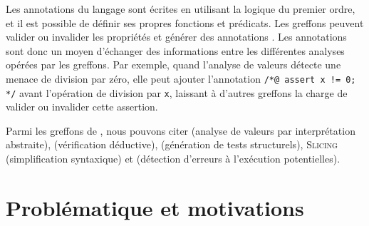 Les annotations du langage \acsl sont écrites en utilisant la logique
du premier ordre, et il est possible de définir ses propres fonctions et
prédicats.
Les greffons peuvent valider ou invalider les propriétés \acsl et
générer des annotations \acsl.
Les annotations sont donc un moyen d'échanger des informations entre les
différentes analyses opérées par les greffons.
Par exemple, quand l'analyse de valeurs détecte une menace de division par zéro,
elle peut ajouter l'annotation \lstinline'/*@ assert x != 0; */' avant
l'opération de division par \lstinline'x', laissant à d'autres greffons la
charge de valider ou invalider cette assertion.

Parmi les greffons de \framac, nous pouvons citer \Value (analyse de valeurs par
interprétation abstraite), \Wp (vérification déductive), \pathcrawler
(génération de tests structurels), \textsc{Slicing} (simplification syntaxique)
et \rte (détection d'erreurs à l'exécution potentielles).


\section{Problématique et motivations}
\label{sec:pb-motiv}


